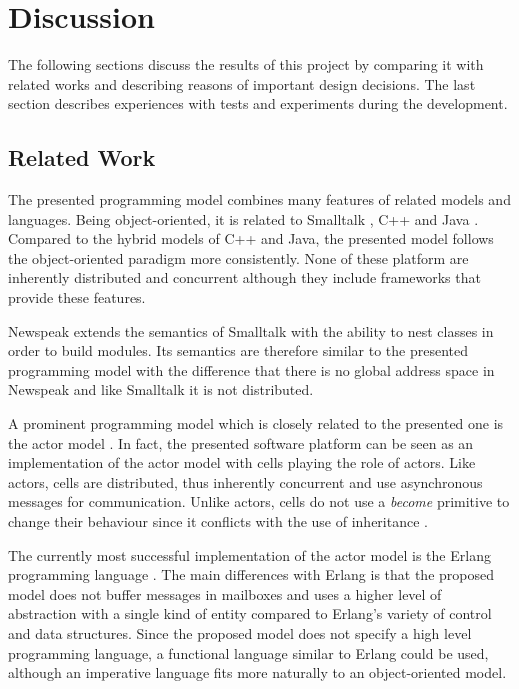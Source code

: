 \graphicspath{{figures/discussion/}}


\chapter{Discussion} 

The following sections discuss the results of this project by comparing it with related works and describing reasons of important design decisions. The last section describes experiences with tests and experiments during the development.

\section{Related Work}

The presented programming model combines many features of related models and languages. Being object-oriented, it is related to Smalltalk \cite{SmalltalkBlueBook, SmalltalkHistory}, C++ \cite{Cpp} and Java \cite{JavaSpecification}. Compared to the hybrid models of C++ and Java, the presented model follows the object-oriented paradigm more consistently. None of these platform are inherently distributed and concurrent although they include frameworks that provide these features.

Newspeak \cite{Newspeak, NewspeakSpecification} extends the semantics of Smalltalk with the ability to nest classes in order to build modules. Its semantics are therefore similar to the presented programming model with the difference that there is no global address space in Newspeak and like Smalltalk it is not distributed.

A prominent programming model which is closely related to the presented one is the actor model \cite{ActorsAgha, ActorsHewitt}. In fact, the presented software platform can be seen as an implementation of the actor model with cells playing the role of actors. Like actors, cells are distributed, thus inherently concurrent and use asynchronous messages for communication. Unlike actors, cells do not use a \textit{become} primitive to change their behaviour since it conflicts with the use of inheritance \cite{ActorInheritance}.

The currently most successful implementation of the actor model is the Erlang programming language \cite{ErlangBook, ErlangHistory}. The main differences with Erlang is that the proposed model does not buffer messages in mailboxes and uses a higher level of abstraction with a single kind of entity compared to Erlang's variety of control and data structures. Since the proposed model does not specify a high level programming language, a functional language similar to Erlang could be used, although an imperative language fits more naturally to an object-oriented model.

